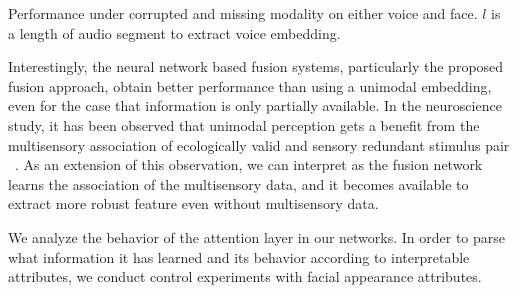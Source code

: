 \documentclass{article}
\begin{document}
\begin{table}[t]
\caption{Performance under corrupted and missing modality on either voice and face. $l$ is a length of audio segment to extract voice embedding.}
\label{tab:missing}
\end{table}

Interestingly, the neural network based fusion systems, particularly the proposed fusion approach, obtain better performance than using a unimodal embedding, even for the case that information is only partially available.
In the neuroscience study, it has been observed that unimodal perception gets a benefit from the multisensory association of ecologically valid and sensory redundant stimulus pair ~\cite{Kreiegstein2006multisensory}.
As an extension of this observation, we can interpret as the fusion network learns the association of the multisensory data, and it becomes available to extract more robust feature even without multisensory data.

We analyze the behavior of the attention layer in our networks.
In order to parse what information it has learned and its behavior according to interpretable attributes, we conduct control experiments with facial appearance attributes.
\end{document}
